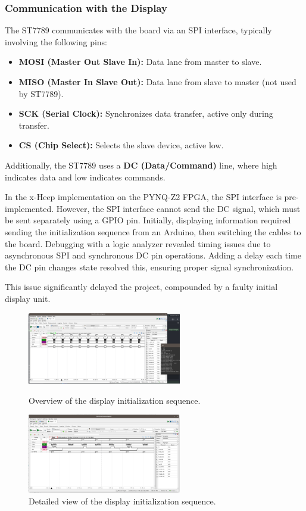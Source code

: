 \subsubsection*{Communication with the Display}


The ST7789 communicates with the board via an SPI interface, typically involving the following pins:
\begin{itemize}
\item \textbf{MOSI (Master Out Slave In):} Data lane from master to slave.
\item \textbf{MISO (Master In Slave Out):} Data lane from slave to master (not used by ST7789).
\item \textbf{SCK (Serial Clock):} Synchronizes data transfer, active only during transfer.
\item \textbf{CS (Chip Select):} Selects the slave device, active low.
\end{itemize}
Additionally, the ST7789 uses a \textbf{DC (Data/Command)} line, where high indicates data and low indicates commands.

In the x-Heep implementation on the PYNQ-Z2 FPGA, the SPI interface is pre-implemented. However, the SPI interface cannot send the DC signal, which must be sent separately using a GPIO pin. Initially, displaying information required sending the initialization sequence from an Arduino, then switching the cables to the board. Debugging with a logic analyzer revealed timing issues due to asynchronous SPI and synchronous DC pin operations. Adding a delay each time the DC pin changes state resolved this, ensuring proper signal synchronization.

This issue significantly delayed the project, compounded by a faulty initial display unit.

\begin{figure}[ht]
    \centering
    \includegraphics[width=0.6\textwidth]{images/Logic_analyzer_zoom_out.png}
    \caption{Overview of the display initialization sequence.}
    \label{fig:Logic_analyzer_zoom_out}
    \vspace{0.5cm}
    \includegraphics[width=0.6\textwidth]{images/Logic_analyzer_zoom_in.png}
    \caption{Detailed view of the display initialization sequence.} 
    \label{fig:Logic_analyzer_zoom_in}
\end{figure}

